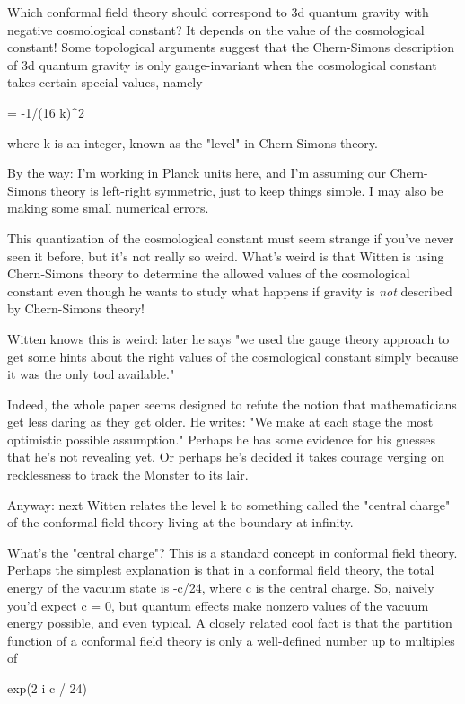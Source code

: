 Which conformal field theory should correspond to 3d quantum 
gravity with negative cosmological constant?  It depends on the 
value of the cosmological constant!  Some topological arguments 
suggest that the Chern-Simons description of 3d quantum gravity 
is only gauge-invariant when the cosmological constant \Lambda  
takes certain special values, namely 

\Lambda  = -1/(16 k)^{2}

where k is an integer, known as the "level" in Chern-Simons theory.

By the way: I'm working in Planck units here, and I'm assuming 
our Chern-Simons theory is left-right symmetric, just to keep 
things simple.  I may also be making some small numerical errors.

This quantization of the cosmological constant must seem strange 
if you've never seen it before, but it's not really so weird.  
What's weird is that Witten is using Chern-Simons theory to 
determine the allowed values of the cosmological constant even 
though he wants to study what happens if gravity is \emph{not}
described by Chern-Simons theory!   

Witten knows this is weird: later he says "we used the gauge 
theory approach to get some hints about the right values of the 
cosmological constant simply because it was the only tool 
available."  

Indeed, the whole paper seems designed to refute the notion that 
mathematicians get less daring as they get older.  He writes: "We 
make at each stage the most optimistic possible assumption."  
Perhaps he has some evidence for his guesses that he's not 
revealing yet.  Or perhaps he's decided it takes courage verging 
on recklessness to track the Monster to its lair.

Anyway: next Witten relates the level k to something called the 
"central charge" of the conformal field theory living at the 
boundary at infinity.  

What's the "central charge"?  This is a standard concept in 
conformal field theory.  Perhaps the simplest explanation is that 
in a conformal field theory, the total energy of the vacuum state 
is -c/24, where c is the central charge.  So, naively you'd expect 
c = 0, but quantum effects make nonzero values of the vacuum energy
possible, and even typical.  A closely related cool fact is that 
the partition function of a conformal field theory is only a 
well-defined number up to multiples of 

exp(2 \pi  i c / 24)

